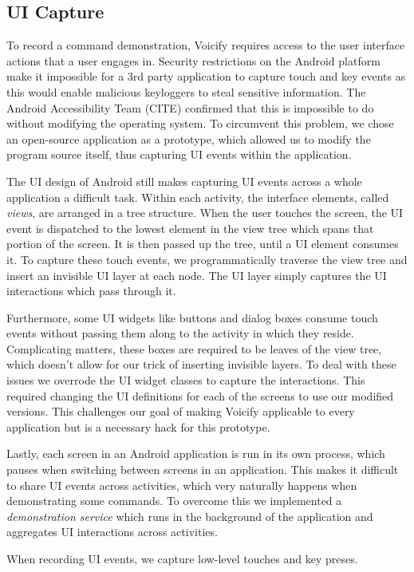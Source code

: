 \documentclass[letterpaper]{article}
\begin{document}
\subsection{UI Capture}
To record a command demonstration, Voicify requires access to the user interface actions that a user engages in.
Security restrictions on the Android platform make it impossible for a 3rd party application to capture 
touch and key events as this would enable malicious keyloggers to steal sensitive information. 
The Android Accessibility Team (CITE) confirmed that this is impossible to do without modifying the operating system.
To circumvent this problem, we chose an open-source application as a prototype, which allowed us to modify
the program source itself, thus capturing UI events within the application.

The UI design of Android still makes capturing UI events across a whole application a difficult task.
Within each activity, the interface elements, called \emph{views}, are arranged in a tree structure. When the user
touches the screen, the UI event is dispatched to the lowest element in the view tree which spans that portion of the 
screen. It is then passed up the tree, until a UI element consumes it. To capture these touch events,
we programmatically traverse the view tree and insert an invisible UI layer at each node. The UI layer
simply captures the UI interactions which pass through it.

Furthermore, some UI widgets like buttons and dialog boxes consume touch events without passing them along
to the activity in which they reside. Complicating matters, these boxes are required to be leaves
of the view tree, which doesn't allow for our trick of inserting invisible layers. To deal with these issues
we overrode the UI widget classes to capture the interactions. This required changing the UI definitions for
each of the screens to use our modified versions. This challenges our goal of making Voicify applicable to
every application but is a necessary hack for this prototype.

Lastly, each screen in an Android application is run in its own process, which pauses when switching between
screens in an application. This makes it difficult to share UI events across activities, which very naturally
happens when demonstrating some commands. To overcome this we implemented a \emph{demonstration service} which runs in the background
of the application and aggregates UI interactions across activities.

When recording UI events, we capture low-level touches and key preses.
\end{document}

